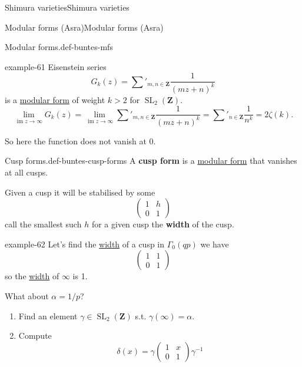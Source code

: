 \documentclass[10pt,]{book}
\newcommand{\terminology}[1]{\textbf{#1}}
\numberwithin{equation}{section}
\newcommand{\inv}{^{-1}}
\newcommand{\ZZ}{\mathbf{Z}}
\DeclareMathOperator{\im}{im}
\DeclareMathOperator{\SL}{SL}
\newcommand{\gt}{>}
\newcommand{\amp}{&}
\begin{document}
\begin{chapterptx}{Shimura varieties}{}{Shimura varieties}{}{}
\begin{sectionptx}{Modular forms (Asra)}{}{Modular forms (Asra)}{}{}
\begin{definition}{Modular forms.}{def-buntes-mfs}
\end{definition}
\begin{example}{}{example-61}%
\hypertarget{p-1060}{}%
Eisenstein series%
\begin{equation*}
G_k(z) = \sum'_{m,n\in \ZZ} \frac{1}{(mz+n)^k}
\end{equation*}
is a \hyperref[def-buntes-mfs]{modular form} of weight \(k \gt 2\) for \(\SL_2(\ZZ)\).%
\begin{equation*}
\lim_{\im z\to \infty} G_k(z) = \lim_{\im z\to \infty} \sum'_{m,n\in \ZZ} \frac{1}{(mz+n)^k} = \sum'_{n\in \ZZ} \frac{1}{n^k} = 2\zeta(k)\text{.}
\end{equation*}
%
\par
\hypertarget{p-1061}{}%
So here the function does not vanish at 0.%
\end{example}
\begin{definition}{Cusp forms.}{def-buntes-cusp-forms}%
\hypertarget{p-1062}{}%
A \terminology{cusp form} is a \hyperref[def-buntes-mfs]{modular form} that vanishes at all cusps.%
\end{definition}
\hypertarget{p-1063}{}%
Given a cusp it will be stabilised by some%
\begin{equation*}
\begin{pmatrix} 1\amp h \\ 0 \amp 1 \end{pmatrix}
\end{equation*}
call the smallest such \(h\) for a given cusp the \terminology{width} of the cusp.%
\begin{example}{}{example-62}%
\hypertarget{p-1064}{}%
Let's find the \hyperref[def-buntes-cusp-forms]{width} of a cusp in \(\Gamma_0(qp)\) we have%
\begin{equation*}
\begin{pmatrix} 1\amp 1 \\ 0 \amp 1 \end{pmatrix}
\end{equation*}
so the \hyperref[def-buntes-cusp-forms]{width} of \(\infty\) is 1.%
\par
\hypertarget{p-1065}{}%
What about \(\alpha = 1/p\)?\leavevmode%
\begin{enumerate}
\item\hypertarget{li-263}{}Find an element \(\gamma \in \SL_2(\ZZ)\) s.t. \(\gamma(\infty) = \alpha\).%
\item\hypertarget{li-264}{}Compute%
\begin{equation*}
\delta(x) = \gamma \begin{pmatrix} 1\amp x \\ 0 \amp 1 \end{pmatrix} \gamma\inv

\end{equation*}
\end{enumerate}
\end{example}
\end{sectionptx}
\end{chapterptx}
\end{document}
